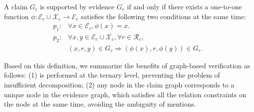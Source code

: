 \begin{assertion}\label{ass:graph}
A claim \( G_c \) is supported by evidence \( G_e \) if and only if there exists a one-to-one function \( \phi: \mathcal{E}_c \cup \mathcal{X}_c \to \mathcal{E}_e \) satisfies the following two conditions at the same time:
    \begin{align*}
        p_1: & \forall x \in \mathcal{E}_c, \phi(x) = x. \\
        p_2: & \forall x, y \in \mathcal{E}_c \cup \mathcal{X}_c, \forall r \in \mathcal{R}_c, \\
        & (x, r, y) \in G_c \Rightarrow (\phi(x), r, \phi(y)) \in G_e.
    \end{align*}
\end{assertion}
Based on this definition, we summarize the benefits of graph-based verification as follows: (1) is performed at the ternary level, preventing the problem of insufficient decomposition; (2) any node in the claim graph corresponds to a unique node in the evidence graph, which satisfies all the relation constraints on the node at the same time, avoiding the ambiguity of mentions.



